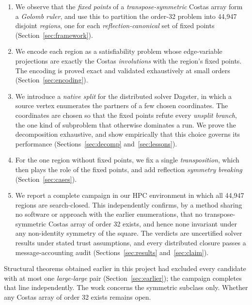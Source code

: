 \documentclass[11pt,a4paper]{article}
\theoremstyle{definition}
\begin{document}
\begin{enumerate}
\item We observe that the \emph{fixed points} of a \emph{transpose-symmetric} Costas array form a \emph{Golomb ruler},
and use this to partition the order-32 problem into 44{,}947 disjoint \emph{regions}, one for each
\emph{reflection-canonical} set of fixed points (Section~\ref{sec:framework}).
\item We encode each region as a satisfiability problem whose edge-variable projections are
exactly the Costas \emph{involutions} with the region's fixed points. The encoding is proved exact and
validated exhaustively at small orders (Section~\ref{sec:encoding}).
\item We introduce a \emph{native split} for the distributed solver Dagster, in which a source vertex
enumerates the partners of a few chosen coordinates. The coordinates are chosen so that the fixed
points refute every \emph{unsplit branch}, the one kind of subproblem that otherwise dominates a run.
We prove the decomposition exhaustive, and show empirically that this choice governs its
performance (Sections~\ref{sec:decomp} and~\ref{sec:lessons}).
\item For the one region without fixed points, we fix a single \emph{transposition}, which then plays
the role of the fixed points, and add reflection \emph{symmetry breaking} (Section~\ref{sec:cases}).
\item We report a complete campaign in our HPC environment in which all 44{,}947 regions are
search-closed. This independently confirms, by a method sharing no software or approach with the
earlier enumerations, that no transpose-symmetric Costas array of order 32 exists, and hence none invariant
under any non-identity symmetry of the square. The
verdicts are uncertified solver results under stated trust assumptions, and every distributed
closure passes a message-accounting audit (Sections~\ref{sec:results} and~\ref{sec:claim}).
\end{enumerate}

Structural theorems obtained earlier in this project had excluded every candidate with at most
one \emph{large-large} pair (Section~\ref{sec:earlier}); the campaign completes that line
independently. The work concerns the symmetric subclass only. Whether any Costas array of order
32 exists remains open.
\end{document}
